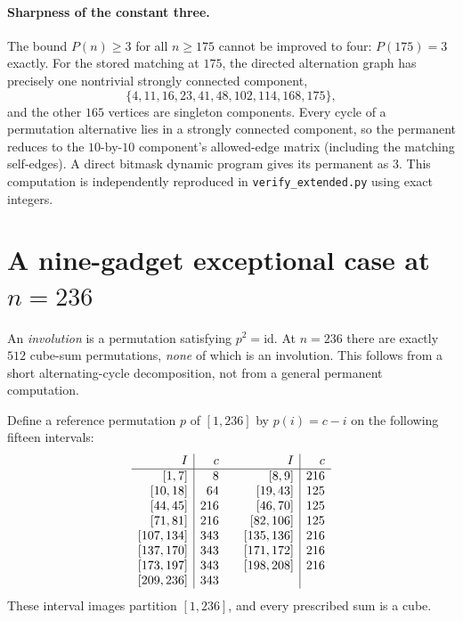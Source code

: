 \documentclass[10pt]{article}
\begin{document}
\paragraph{Sharpness of the constant three.}
The bound $P(n)\ge3$ for all $n\ge175$ cannot be
improved to four: $P(175)=3$ exactly.
For the stored matching at $175$, the directed
alternation graph has precisely one nontrivial
strongly connected component,
\[
\{4,11,16,23,41,48,102,114,168,175\},
\]
and the other $165$ vertices are singleton components.
Every cycle of a permutation alternative lies in a
strongly connected component, so the permanent reduces
to the $10$-by-$10$ component's allowed-edge matrix
(including the matching self-edges).
A direct bitmask dynamic program gives its permanent
as $3$. This computation is independently reproduced in
\texttt{verify\_extended.py} using exact integers.

\section{A nine-gadget exceptional case at $n=236$}
\label{sec:236}

An \emph{involution} is a permutation satisfying
$p^2=\mathrm{id}$. At $n=236$ there are exactly $512$
cube-sum permutations, \emph{none} of which is an involution.
This follows from a short alternating-cycle decomposition,
not from a general permanent computation.

Define a reference permutation $p$ of $[1,236]$ by
$p(i)=c-i$ on the following fifteen intervals:
\[
\begin{array}{r|r@{\qquad}r|r}
I&c&I&c\\ \hline
{[1,7]}&8 &[8,9]&216\\
{[10,18]}&64 &[19,43]&125\\
{[44,45]}&216 &[46,70]&125\\
{[71,81]}&216 &[82,106]&125\\
{[107,134]}&343 &[135,136]&216\\
{[137,170]}&343 &[171,172]&216\\
{[173,197]}&343 &[198,208]&216\\
{[209,236]}&343 &&
\end{array}
\]
These interval images partition $[1,236]$, and
every prescribed sum is a cube.
\end{document}
